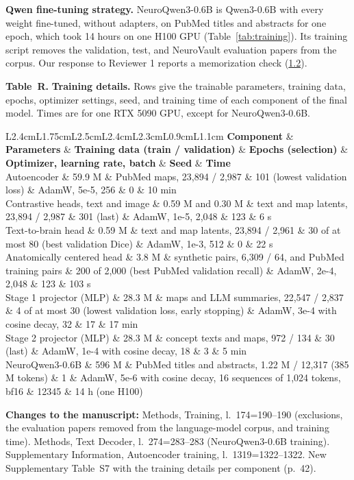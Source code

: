 \documentclass[11pt]{article}
\renewcommand{\thetable}{R\arabic{table}}
\newcommand{\revchanges}[1]{\par{\small\raggedright\textbf{Changes to the manuscript:} #1\par}}  %
\providecommand{\mslink}[2]{#2}
\newcommand{\msl}[2]{\begingroup\edef\x{\endgroup\noexpand\mslink{\number\numexpr(#1+22)/46\relax}}%
  \x{\mbox{l.~#1\ifnum#1=#2\else--#2\fi}}}
\newcommand{\msp}[1]{\mslink{#1}{p.~#1}}
\providecommand{\mspg}[1]{0}
\DeclareRobustCommand{\mscap}[2]{\begingroup\edef\x{\endgroup\noexpand\mslink{\mspg{#1}}}\x{#2}}  %
\newcommand{\mstab}[1]{\mscap{Table.#1}{Table~#1}}
\newcommand{\cmt}[1]{\hyperref[sec:#1]{#1}}
\newcommand{\rtab}[2]{\par\begin{center}\refstepcounter{table}\begin{minipage}{\linewidth}\centering
  \parbox{\linewidth}{\footnotesize\textbf{Table~\thetable.} #1}\par\smallskip#2\end{minipage}\end{center}}
\begin{document}
\textbf{Qwen fine-tuning strategy.} NeuroQwen3-0.6B is Qwen3-0.6B with every weight fine-tuned, without adapters, on PubMed titles and abstracts for one epoch, which took 14 hours on one H100 GPU (Table~\ref{tab:training}). Its training script removes the validation, test, and NeuroVault evaluation papers from the corpus. Our response to Reviewer 1 reports a memorization check (\cmt{1.2}).
\rtab{\textbf{Training details.} Rows give the trainable parameters, training data, epochs, optimizer settings, seed, and training time of each component of the final model. Times are for one RTX 5090 GPU, except for NeuroQwen3-0.6B.\label{tab:training}}{\scriptsize\begin{tabular}{L{2.4cm}L{1.75cm}L{2.5cm}L{2.4cm}L{2.3cm}L{0.9cm}L{1.1cm}}\toprule
\textbf{Component} & \textbf{Parameters} & \textbf{Training data (train / validation)} & \textbf{Epochs (selection)} & \textbf{Optimizer, learning rate, batch} & \textbf{Seed} & \textbf{Time} \\\midrule
Autoencoder & 59.9 M & PubMed maps, 23,894 / 2,987 & 101 (lowest validation loss) & AdamW, 5e-5, 256 & 0 & 10 min \\
Contrastive heads, text and image & 0.59 M and 0.30 M & text and map latents, 23,894 / 2,987 & 301 (last) & AdamW, 1e-5, 2,048 & 123 & 6 s \\
Text-to-brain head & 0.59 M & text and map latents, 23,894 / 2,961 & 30 of at most 80 (best validation Dice) & AdamW, 1e-3, 512 & 0 & 22 s \\
Anatomically centered head & 3.8 M & synthetic pairs, 6,309 / 64, and PubMed training pairs & 200 of 2,000 (best PubMed validation recall) & AdamW, 2e-4, 2,048 & 123 & 103 s \\
Stage 1 projector (MLP) & 28.3 M & maps and LLM summaries, 22,547 / 2,837 & 4 of at most 30 (lowest validation loss, early stopping) & AdamW, 3e-4 with cosine decay, 32 & 17 & 17 min \\
Stage 2 projector (MLP) & 28.3 M & concept texts and maps, 972 / 134 & 30 (last) & AdamW, 1e-4 with cosine decay, 18 & 3 & 5 min \\
NeuroQwen3-0.6B & 596 M & PubMed titles and abstracts, 1.22 M / 12,317 (385 M tokens) & 1 & AdamW, 5e-6 with cosine decay, 16 sequences of 1,024 tokens, bf16 & 12345 & 14 h (one H100) \\
\bottomrule\end{tabular}}
\revchanges{Methods, Training, \msl{174}{190} (exclusions, the evaluation papers removed from the language-model corpus, and training time). Methods, Text Decoder, \msl{274}{283} (NeuroQwen3-0.6B training). Supplementary Information, Autoencoder training, \msl{1319}{1322}. New Supplementary \mstab{S7} with the training details per component (\msp{42}).}
\end{document}
